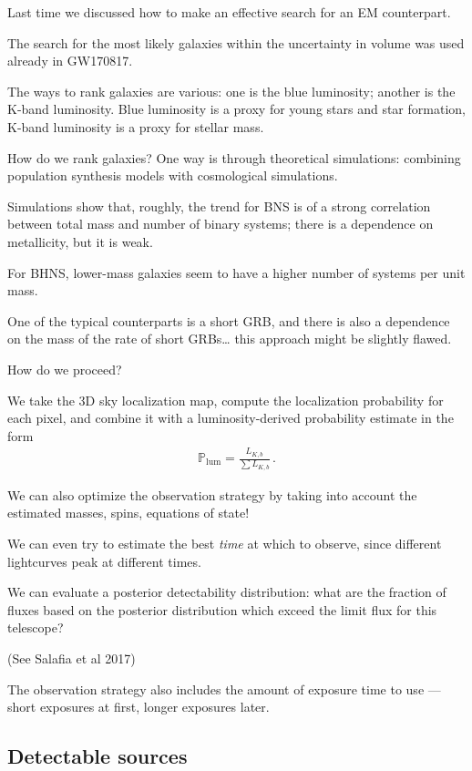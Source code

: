 \documentclass[main.tex]{subfiles}
\begin{document}

Last time we discussed how to make an effective search for an EM counterpart. 

The search for the most likely galaxies within the 
uncertainty in volume was used already in GW170817.

The ways to rank galaxies are various: one is the blue luminosity; 
another is the K-band luminosity. 
Blue luminosity is a proxy for young stars and star formation, 
K-band luminosity is a proxy for stellar mass. 

How do we rank galaxies? 
One way is through theoretical simulations: 
combining population synthesis models with cosmological simulations. 

Simulations show that, roughly, the trend for BNS is of a strong correlation between total mass and number of binary systems; 
there is a dependence on metallicity, but it is weak. 

For BHNS, lower-mass galaxies seem to have a higher number of systems 
per unit mass.

One of the typical counterparts is a short GRB, 
and there is also a dependence on the mass of the rate of short GRBs\dots
this approach might be slightly flawed. 

How do we proceed? 

We take the 3D sky localization map, compute the localization probability for each pixel, and combine it with a luminosity-derived probability estimate in the form 
%
\begin{align}
\mathbb{P} _{\text{lum}} = \frac{L_{K, b}}{\sum L_{K, b}}
\,.
\end{align}

We can also optimize the observation strategy by 
taking into account the estimated masses, spins, equations of state! 

We can even try to estimate the best \emph{time} at which to observe, 
since different lightcurves peak at different times. 

We can evaluate a posterior detectability distribution: 
what are the fraction of fluxes based on the posterior distribution 
which exceed the limit flux for this telescope? 

(See Salafia et al 2017)

The observation strategy also includes the amount of 
exposure time to use --- short exposures at first, longer exposures
later. 

\subsection{Detectable sources}
\end{document}
